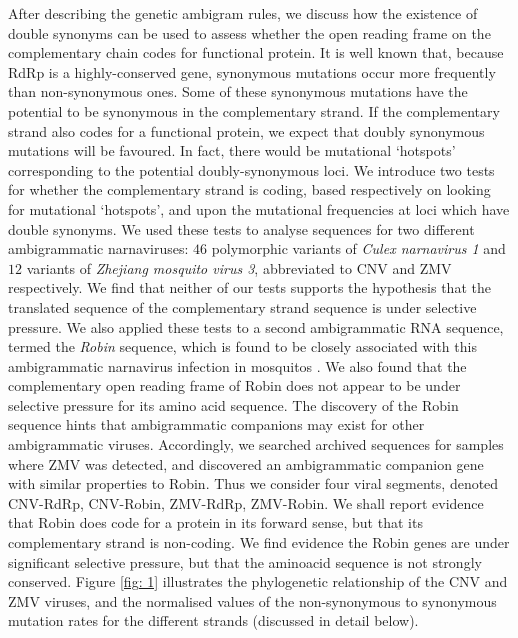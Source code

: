 \documentclass[unnumsec,webpdf,contemporary,large,namedate]{oup-authoring-template}%
\theoremstyle{thmstyleone}%
\theoremstyle{thmstyletwo}%
\theoremstyle{thmstylethree}%
\begin{document}
After describing the genetic ambigram rules, we discuss how the existence of double synonyms 
can be used to assess whether the open reading frame on the complementary chain codes for 
functional protein. It is well known that, because RdRp is a highly-conserved gene, synonymous 
mutations occur more frequently than non-synonymous ones. Some of these synonymous 
mutations have the potential to be synonymous in the complementary strand. If the complementary 
strand also codes for a functional protein, we expect that doubly synonymous mutations will be 
favoured. In fact, there would be mutational \lq hotspots' corresponding to the potential 
doubly-synonymous loci. We introduce two tests for whether the complementary strand 
is coding, based respectively on looking for mutational \lq hotspots', and upon the mutational
frequencies at loci which have double synonyms. We used these tests to analyse sequences for 
two different ambigrammatic narnaviruses: $46$ polymorphic variants of \emph{Culex narnavirus 1} and 
$12$ variants of \emph{Zhejiang mosquito virus 3}, abbreviated to CNV and ZMV respectively.
We find that neither of our tests supports the hypothesis 
that the translated sequence of the complementary strand sequence 
is under selective pressure. We also applied these tests to a second ambigrammatic RNA sequence, 
termed the \emph{Robin} sequence, which is found to be closely associated with this 
ambigrammatic narnavirus infection in mosquitos \citep{Bat+20,Ret+20}. We also found that the  
complementary open reading frame of Robin does not appear to be under selective pressure for its amino acid 
sequence. The discovery of the Robin sequence hints that ambigrammatic companions may exist for 
other ambigrammatic viruses. Accordingly, we searched archived sequences for samples where ZMV was 
detected, and discovered an ambigrammatic companion gene with similar properties to Robin.
Thus we consider four viral segments, denoted CNV-RdRp, CNV-Robin, ZMV-RdRp, ZMV-Robin.
We shall report evidence that Robin does code for a protein in its forward sense, but that its 
complementary strand is non-coding. We find evidence the Robin genes are under significant 
selective pressure, but that the aminoacid sequence is not strongly conserved. Figure \ref{fig: 1} 
illustrates the phylogenetic relationship of the CNV and ZMV viruses, and the normalised values 
of the non-synonymous to synonymous mutation rates for the different strands (discussed in detail below).
\end{document}
